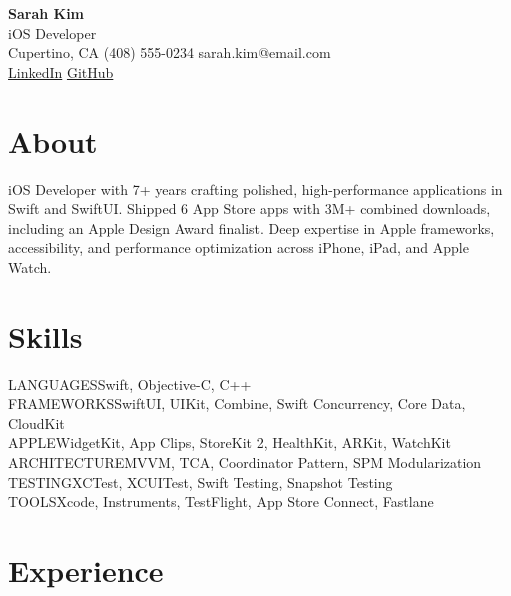 \documentclass[10.5pt,a4paper]{article}
\begin{document}
\begin{center}
{\fontsize{26}{30}\selectfont\bfseries Sarah Kim}\\[8pt]
{\color{secondary}\small iOS Developer}\\[6pt]
{\small Cupertino, CA \quad\textperiodcentered\quad (408) 555-0234 \quad\textperiodcentered\quad sarah.kim@email.com}\\[3pt]
{\small \href{https://linkedin.com/in/sarahkim-ios}{\color{accent}LinkedIn} \quad\textperiodcentered\quad \href{https://github.com/skim-swift}{\color{accent}GitHub}}
\end{center}

\vspace{6pt}

\section{About}
iOS Developer with 7+ years crafting polished, high-performance applications in Swift and SwiftUI. Shipped 6 App Store apps with 3M+ combined downloads, including an Apple Design Award finalist. Deep expertise in Apple frameworks, accessibility, and performance optimization across iPhone, iPad, and Apple Watch.

\section{Skills}
{\color{secondary}\small LANGUAGES}\quad Swift, Objective-C, C++\\[3pt]
{\color{secondary}\small FRAMEWORKS}\quad SwiftUI, UIKit, Combine, Swift Concurrency, Core Data, CloudKit\\[3pt]
{\color{secondary}\small APPLE}\quad WidgetKit, App Clips, StoreKit 2, HealthKit, ARKit, WatchKit\\[3pt]
{\color{secondary}\small ARCHITECTURE}\quad MVVM, TCA, Coordinator Pattern, SPM Modularization\\[3pt]
{\color{secondary}\small TESTING}\quad XCTest, XCUITest, Swift Testing, Snapshot Testing\\[3pt]
{\color{secondary}\small TOOLS}\quad Xcode, Instruments, TestFlight, App Store Connect, Fastlane

\section{Experience}
\end{document}
